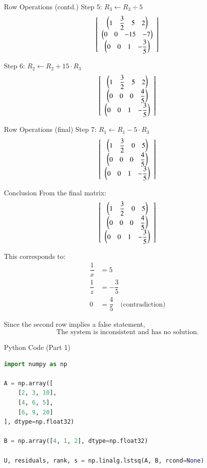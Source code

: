 \documentclass{beamer}
\begin{document}
\begin{frame}{Row Operations (contd.)}
Step 5: \( R_3 \leftarrow R_3 \div 5 \)
\[
\left[
\begin{array}{c}
\begin{pmatrix}1 & \dfrac{3}{2} & 5 & 2\end{pmatrix} \\
\begin{pmatrix}0 & 0 & -15 & -7\end{pmatrix} \\
\begin{pmatrix}0 & 0 & 1 & -\dfrac{3}{5}\end{pmatrix}
\end{array}
\right]
\]

Step 6: \( R_2 \leftarrow R_2 + 15 \cdot R_3 \)
\[
\left[
\begin{array}{c}
\begin{pmatrix}1 & \dfrac{3}{2} & 5 & 2\end{pmatrix} \\
\begin{pmatrix}0 & 0 & 0 & \dfrac{4}{5}\end{pmatrix} \\
\begin{pmatrix}0 & 0 & 1 & -\dfrac{3}{5}\end{pmatrix}
\end{array}
\right]
\]
\end{frame}

\begin{frame}{Row Operations (final)}
Step 7: \( R_1 \leftarrow R_1 - 5 \cdot R_3 \)
\[
\left[
\begin{array}{c}
\begin{pmatrix}1 & \dfrac{3}{2} & 0 & 5\end{pmatrix} \\
\begin{pmatrix}0 & 0 & 0 & \dfrac{4}{5}\end{pmatrix} \\
\begin{pmatrix}0 & 0 & 1 & -\dfrac{3}{5}\end{pmatrix}
\end{array}
\right]
\]
\end{frame}

\begin{frame}{Conclusion}
From the final matrix:
\[
\left[
\begin{array}{c}
\begin{pmatrix}1 & \dfrac{3}{2} & 0 & 5\end{pmatrix} \\
\begin{pmatrix}0 & 0 & 0 & \dfrac{4}{5}\end{pmatrix} \\
\begin{pmatrix}0 & 0 & 1 & -\dfrac{3}{5}\end{pmatrix}
\end{array}
\right]
\]

This corresponds to:
\[
\begin{aligned}
\dfrac{1}{x} &= 5 \\
\dfrac{1}{z} &= -\dfrac{3}{5} \\
0 &= \dfrac{4}{5} \quad \text{(contradiction)}
\end{aligned}
\]

\vspace{0.3cm}
Since the second row implies a false statement,  
\[
\boxed{\text{The system is inconsistent and has no solution.}}
\]
\end{frame}


\begin{frame}[fragile]{Python Code (Part 1)}
\begin{lstlisting}[language=Python]
import numpy as np

A = np.array([
    [2, 3, 10],
    [4, 6, 5],
    [6, 9, 20]
], dtype=np.float32)

B = np.array([4, 1, 2], dtype=np.float32)

U, residuals, rank, s = np.linalg.lstsq(A, B, rcond=None)
\end{lstlisting}
\end{frame}
\end{document}
